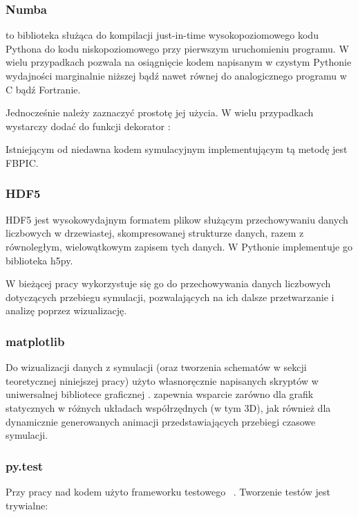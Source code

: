 \subsubsection{Numba}
 to biblioteka służąca do kompilacji just-in-time wysokopoziomowego
kodu Pythona do kodu niskopoziomowego przy pierwszym uruchomieniu programu. W
wielu przypadkach pozwala na osiągnięcie kodem napisanym w czystym Pythonie
wydajności marginalnie niższej bądź nawet równej do analogicznego programu w C
bądź Fortranie. \cite{numba}

Jednocześnie należy zaznaczyć prostotę jej użycia. W wielu przypadkach wystarczy
dodać do funkcji dekorator :



Istniejącym od niedawna kodem symulacyjnym implementującym tą metodę jest FBPIC\cite{fbpic}.


\subsubsection{HDF5}
HDF5 jest wysokowydajnym formatem plikow służącym przechowywaniu danych
liczbowych w drzewiastej, skompresowanej strukturze danych, razem z
równoległym, wielowątkowym zapisem tych danych.  W Pythonie implementuje go
biblioteka h5py\cite{h5py}.

W bieżącej pracy wykorzystuje się go do przechowywania danych liczbowych
dotyczących przebiegu symulacji, pozwalających na ich dalsze przetwarzanie
i analizę poprzez wizualizację.

\subsubsection{matplotlib}
Do wizualizacji danych z symulacji (oraz tworzenia schematów w sekcji
teoretycznej niniejszej pracy) użyto własnoręcznie napisanych skryptów w
uniwersalnej bibliotece graficznej \cite{matplotlib}.
 zapewnia wsparcie zarówno dla grafik statycznych w różnych układach
współrzędnych (w tym 3D), jak również dla dynamicznie generowanych animacji
przedstawiających przebiegi czasowe symulacji.

\subsubsection{py.test}
Przy pracy nad kodem użyto frameworku testowego ~\cite{pytest}.
Tworzenie testów jest trywialne:

